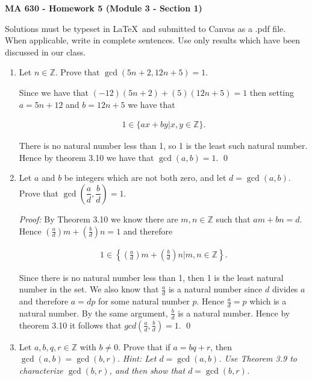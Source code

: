 \documentclass[12pt]{article}
\begin{document}
\pagestyle{empty}

 {\noindent \textbf{\large MA 630 - Homework 5 (Module 3 - Section 1)}
\vspace{.25in}

\noindent Solutions must be typeset in \LaTeX \ and submitted to Canvas as a .pdf file. When applicable, write in complete sentences. Use only results which have been discussed in our class.
\vspace{.25in}

\begin{enumerate}
\item Let $n \in \mathbb{Z}$. Prove that $\gcd(5n + 2, 12n + 5) = 1$.

Since we have that $(-12)(5n+2) + (5)(12n+5) = 1$ then setting $a=5n+12$ and $b=12n+5$ we have that

\begin{align*}
  1\in \{ax+by| x,y\in\mathbb Z\}.
\end{align*}

There is no natural number less than 1, so 1 is the least such natural number.  Hence by theorem 3.10 we have that $\gcd(a,b)=1$.  \qed

\item Let $a$ and $b$ be integers which are not both zero, and let $d = \gcd(a,b)$. Prove that $\gcd\left(\dfrac{a}{d}, \dfrac{b}{d}\right)  = 1$.

{\it Proof:} By Theorem 3.10 we know there are $m,n\in\mathbb Z$ such that $am+bn=d$.  Hence $\left(\frac{a}{d}\right)m+\left(\frac{b}{d}\right)n = 1$ and therefore

\begin{align*}
  1\in\left\{\left(\frac{a}{d}\right)m+\left(\frac{b}{d}\right)n|m,n\in\mathbb Z\right\}.
\end{align*}

Since there is no natural number less than 1, then 1 is the least natural number in the set.  We also know that $\frac{a}{d}$ is a natural number since $d$ divides $a$ and therefore $a = dp$ for some natural number $p$.  Hence $\frac a d = p$ which is a natural number.  By the same argument, $\frac{b}{d}$ is a natural number.  Hence by theorem 3.10 it follows that  $gcd\left(\frac{a}{d},\frac{b}{d}\right)=1$. \qed

\item Let $a, b, q, r \in \mathbb{Z}$ with $b \neq 0$. Prove that if $a = bq + r$, then $\gcd(a,b) = \gcd(b,r)$. \emph{Hint: Let $d = \gcd(a,b)$. Use Theorem 3.9 to characterize $\gcd(b,r)$, and then show that $d = \gcd(b,r)$.}


\end{enumerate}}
\end{document}
